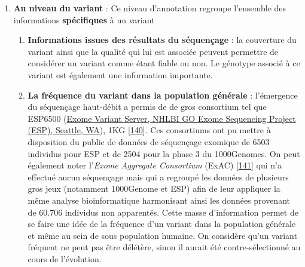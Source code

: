 \documentclass[12pt,twoside]{reedthesis}
\providecommand{\tightlist}{%
  \setlength{\itemsep}{0pt}\setlength{\parskip}{0pt}}
\theoremstyle{definition}
\theoremstyle{definition}
\theoremstyle{remark}
\begin{document}
  \begin{enumerate}
  \def\labelenumi{\arabic{enumi}.}
  \tightlist
  \item
    \textbf{Au niveau du variant} : Ce niveau d'annotation regroupe
    l'ensemble des informations \textbf{spécifiques} à un variant
  
    \begin{enumerate}
    \def\labelenumii{\alph{enumii}.}
    \tightlist
    \item
      \textbf{Informations issues des résultats du séquençage} : la
      couverture du variant ainsi que la qualité qui lui est associée
      peuvent permettre de considérer un variant comme étant fiable ou
      non. Le génotype associé à ce variant est également une information
      importante.\\
    \item
      \textbf{La fréquence du variant dans la population générale} :
      l'émergence du séquençage haut-débit a permis de de gros consortium
      tel que ESP6500 (\href{http://evs.gs.washington.edu/EVS/}{Exome
      Variant Server, NHLBI GO Exome Sequencing Project (ESP), Seattle,
      WA}), 1KG
      {[}\protect\hyperlink{ref-1000GenomesProjectConsortium2015}{140}{]}.
      Ces consortiums ont pu mettre à disposition du public de données de
      séquençage exomique de 6503 individus pour ESP et de 2504 pour la
      phase 3 du 1000Genomes. On peut également noter l'\emph{Exome
      Aggregate Consortium} (ExAC)
      {[}\protect\hyperlink{ref-Lek2016}{141}{]} qui n'a effectué aucun
      séquençage mais qui a regroupé les données de plusieurs gros jeux
      (notamment 1000Genome et ESP) afin de leur appliquer la même analyse
      bioinformatique harmonisant ainsi les données provenant de 60.706
      individus non apparentés. Cette masse d'information permet de se
      faire une idée de la fréquence d'un variant dans la population
      générale et même au sein de sous population humaine. On considère
      qu'un variant fréquent ne peut pas être délétère, sinon il aurait
      été contre-sélectionné au cours de l'évolution.
    \end{enumerate}
  \end{enumerate}
  
  \newpage
  
\end{document}
